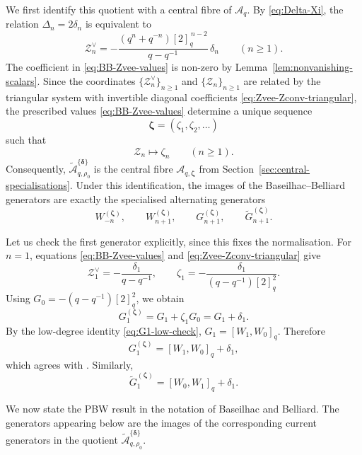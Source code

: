 \documentclass[11pt]{extarticle}
\theoremstyle{definition}
\theoremstyle{remark}
\numberwithin{equation}{section}
\newcommand{\Aq}{\mathcal A_q}
\newcommand{\Aqfib}[1]{\mathcal A_{q,#1}}
\newcommand{\BBqquot}[2]{\widetilde{\mathcal A}_{q,#1}^{\{#2\}}}
\newcommand{\Zvee}{\mathcal Z^{\vee}}
\newcommand{\Zconv}{\mathcal Z}
\begin{document}
We first identify this quotient with a central fibre of \(\Aq\).  By
\eqref{eq:Delta-Xi}, the relation \(\Delta_n=2\delta_n\) is equivalent to
\begin{equation}
\label{eq:BB-Zvee-values}
 \Zvee_n
 =
 -\frac{(q^n+q^{-n})[2]_q^{\,n-2}}{q-q^{-1}}\,
 \delta_n
 \qquad(n\geq1).
\end{equation}
The coefficient in \eqref{eq:BB-Zvee-values} is non-zero by
Lemma~\ref{lem:nonvanishing-scalars}.  Since the coordinates
\(\{\Zvee_n\}_{n\geq1}\) and \(\{\Zconv_n\}_{n\geq1}\) are related by the
triangular system with invertible diagonal coefficients \eqref{eq:Zvee-Zconv-triangular}, the prescribed values
\eqref{eq:BB-Zvee-values} determine a unique sequence
\[
        \boldsymbol\zeta=(\zeta_1,\zeta_2,\ldots)
\]
such that
\[
        \Zconv_n\longmapsto \zeta_n
        \qquad(n\geq1).
\]
Consequently, \(\BBqquot{\rho_0}{\boldsymbol\delta}\) is the central fibre
\(\Aqfib{\boldsymbol\zeta}\) from
Section~\ref{sec:central-specialisations}.  Under this identification, the
images of the Baseilhac--Belliard generators are exactly the specialised
alternating generators
\[
 W_{-n}^{(\boldsymbol\zeta)},\qquad
 W_{n+1}^{(\boldsymbol\zeta)},\qquad
 G_{n+1}^{(\boldsymbol\zeta)},\qquad
 \widetilde G_{n+1}^{(\boldsymbol\zeta)} .
\]

Let us check the first generator explicitly, since this fixes the
normalisation.  For \(n=1\), equations \eqref{eq:BB-Zvee-values} and
\eqref{eq:Zvee-Zconv-triangular} give
\[
        \Zvee_1=-\frac{\delta_1}{q-q^{-1}},
        \qquad
        \zeta_1=-\frac{\delta_1}{(q-q^{-1})[2]_q^2}.
\]
Using \(G_0=-(q-q^{-1})[2]_q^2\), we obtain
\begin{equation}
\label{eq:BB-low-check}
        G_1^{(\boldsymbol\zeta)}
        =
        G_1+\zeta_1G_0
        =
        G_1+\delta_1 .
\end{equation}
By the low-degree identity \eqref{eq:G1-low-check},
\(G_1=[W_1,W_0]_q\).  Therefore
\[
        G_1^{(\boldsymbol\zeta)}
        =
        [W_1,W_0]_q+\delta_1,
\]
which agrees with \cite[Equation~(3.5)]{BaseilhacBelliard2017}.  Similarly,
\[
        \widetilde G_1^{(\boldsymbol\zeta)}
        =
        [W_0,W_1]_q+\delta_1.
\]

We now state the PBW result in the notation of Baseilhac and Belliard.  The
generators appearing below are the images of the corresponding current
generators in the quotient
\(\BBqquot{\rho_0}{\boldsymbol\delta}\).
\end{document}
